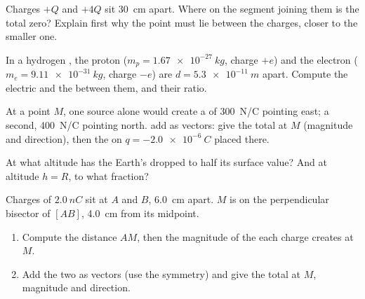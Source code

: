 \begin{exercise}[$\star\star$]\label{exo:g11:electric-gravitational-fields:9}
Charges $+Q$ and $+4Q$ sit \qty{30}{cm} apart. Where on the segment
joining them is the total  zero? Explain first why the point must
lie between the charges, closer to the smaller one.
\end{exercise}

\begin{exercise}[$\star\star$]\label{exo:g11:electric-gravitational-fields:10}
In a hydrogen , the proton ($m_p = \qty{1.67e-27}{kg}$, charge
$+e$) and the electron ($m_e = \qty{9.11e-31}{kg}$, charge $-e$) are
$d = \qty{5.3e-11}{m}$ apart. Compute the electric and the
 between them, and their ratio.
\end{exercise}

\begin{exercise}[$\star\star$]\label{exo:g11:electric-gravitational-fields:11}
At a point $M$, one source alone would create a  of \qty{300}{N/C}
pointing east; a second, \qty{400}{N/C} pointing north.  add as
vectors: give the total  at $M$ (magnitude and direction), then
the  on $q = \qty{-2.0e-6}{C}$ placed there.
\end{exercise}

\begin{exercise}[$\star\star\star$]\label{exo:g11:electric-gravitational-fields:12}
At what altitude has the Earth's  dropped to half its surface
value? And at altitude $h = R$, to what fraction?
\end{exercise}

\begin{exercise}[$\star\star\star$]\label{exo:g11:electric-gravitational-fields:13}
Charges of $\qty{+2.0}{nC}$ sit at $A$ and $B$, \qty{6.0}{cm} apart.
$M$ is on the perpendicular bisector of $[AB]$, \qty{4.0}{cm} from its
midpoint.
\begin{enumerate}
  \item Compute the distance $AM$, then the magnitude of the  each
        charge creates at $M$.
  \item Add the two  as vectors (use the symmetry) and give the
        total  at $M$, magnitude and direction.
\end{enumerate}
\end{exercise}

